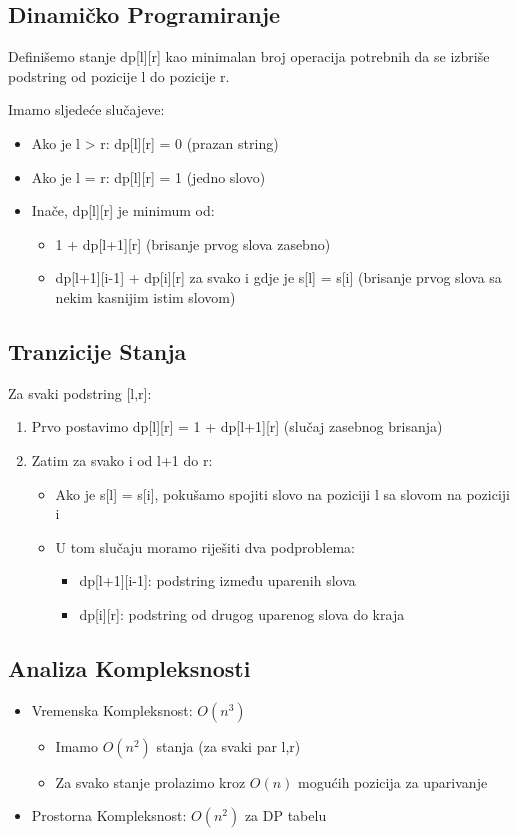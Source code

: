 \subsection{Dinamičko Programiranje}
Definišemo stanje dp[l][r] kao minimalan broj operacija potrebnih da se izbriše podstring od pozicije l do pozicije r.

Imamo sljedeće slučajeve:
\begin{itemize}
    \item Ako je l > r: dp[l][r] = 0 (prazan string)
    \item Ako je l = r: dp[l][r] = 1 (jedno slovo)
    \item Inače, dp[l][r] je minimum od:
        \begin{itemize}
            \item 1 + dp[l+1][r] (brisanje prvog slova zasebno)
            \item dp[l+1][i-1] + dp[i][r] za svako i gdje je s[l] = s[i] (brisanje prvog slova sa nekim kasnijim istim slovom)
        \end{itemize}
\end{itemize}

\subsection{Tranzicije Stanja}
Za svaki podstring [l,r]:
\begin{enumerate}
    \item Prvo postavimo dp[l][r] = 1 + dp[l+1][r] (slučaj zasebnog brisanja)
    \item Zatim za svako i od l+1 do r:
        \begin{itemize}
            \item Ako je s[l] = s[i], pokušamo spojiti slovo na poziciji l sa slovom na poziciji i
            \item U tom slučaju moramo riješiti dva podproblema:
                \begin{itemize}
                    \item dp[l+1][i-1]: podstring između uparenih slova
                    \item dp[i][r]: podstring od drugog uparenog slova do kraja
                \end{itemize}
        \end{itemize}
\end{enumerate}

\subsection{Analiza Kompleksnosti}
\begin{itemize}
    \item Vremenska Kompleksnost: $O(n^3)$
        \begin{itemize}
            \item Imamo $O(n^2)$ stanja (za svaki par l,r)
            \item Za svako stanje prolazimo kroz $O(n)$ mogućih pozicija za uparivanje
        \end{itemize}
    \item Prostorna Kompleksnost: $O(n^2)$ za DP tabelu
\end{itemize}

